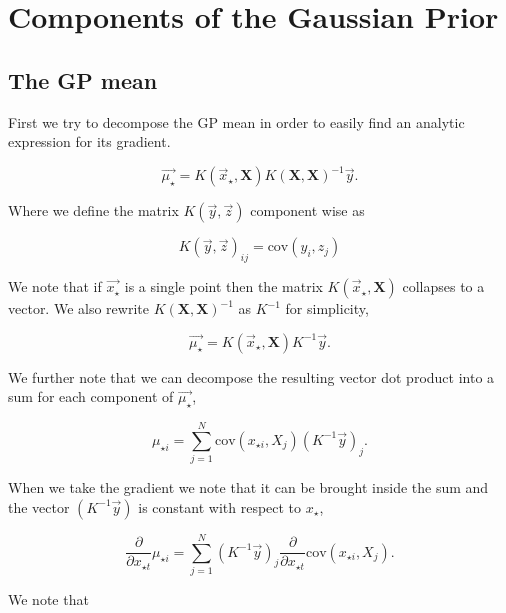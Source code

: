 \documentclass[phd,tocprelim]{cornell}
\begin{document}
\section{Components of the Gaussian Prior}

\subsection{The GP mean}

First we try to decompose the GP mean in order to easily find an analytic expression for its gradient.

\begin{equation}
 \vec{\mu_{\star}} = K(\vec{x}_{\star}, \textbf{X} )K(\textbf{X},\textbf{X})^{-1}\vec{y}.
\end{equation}

Where we define the matrix $K(\vec{y}, \vec{z})$ component wise as

\begin{equation}
 K(\vec{y}, \vec{z})_{ij} = \mbox{cov}(y_{i}, z_{j})
\end{equation}

We note that if $\vec{x_{\star}}$ is a single point then the matrix $K(\vec{x}_{\star}, \textbf{X} )$ collapses to a vector. We also rewrite $K(\textbf{X},\textbf{X})^{-1}$ as $K^{-1}$ for simplicity,

\begin{equation}
 \vec{\mu_{\star}} = K(\vec{x}_{\star}, \textbf{X} ) K^{-1} \vec{y}.
\end{equation}

We further note that we can decompose the resulting vector dot product into a sum for each component of $\vec{\mu_{\star}}$,

\begin{equation}
 \mu_{\star {i}} = \sum_{j = 1}^{N} \mbox{cov}(x_{\star i}, X_{j}) \left(K^{-1} \vec{y} \right)_{j}.
\end{equation}

When we take the gradient we note that it can be brought inside the sum and the vector $(K^{-1}\vec{y})$ is constant with respect to $x_{\star}$,

\begin{equation}
 \frac{\partial}{\partial x_{\star t}} \mu_{\star i} = \sum_{j = 1}^{N} \left(K^{-1} \vec{y} \right)_{j} \frac{\partial}{\partial x_{\star t}} \mbox{cov}(x_{\star i}, X_{j}).
\end{equation}

We note that
\end{document}
